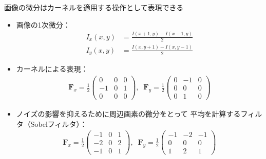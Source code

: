 \documentclass[10pt]{beamer}
\begin{document}
	\begin{frame}{画像の微分はカーネルを適用する操作として表現できる}
	    \begin{itemize}
	        \item 画像の1次微分：
        	    \begin{align*}
        	        I_x(x, y) &= \frac{I(x+1, y)-I(x-1, y)}{2} \\
        	        I_y(x, y) &= \frac{I(x, y+1)-I(x, y-1)}{2} 
        	    \end{align*}
	        \item カーネルによる表現：
        	    \begin{align*}
        	        \bm F_x = \frac{1}{2}
        	        \begin{pmatrix}
        	            0   &0  &0  \\
        	            -1   &0  &1  \\
        	            0   &0  &0  
        	        \end{pmatrix},\;\;
        	        \bm F_y = \frac{1}{2}
        	        \begin{pmatrix}
        	            0   &-1  &0  \\
        	            0   &0  &0  \\
        	            0   &1  &0  
        	        \end{pmatrix}
        	    \end{align*}
            \item ノイズの影響を抑えるために周辺画素の微分をとって
                平均を計算するフィルタ（Sobelフィルタ）：
                \begin{align*}
        	        \bm F_x = \frac{1}{2}
        	        \begin{pmatrix}
        	            -1   &0  &1  \\
        	            -2   &0  &2  \\
        	            -1   &0  &1  
        	        \end{pmatrix},\;\;
        	        \bm F_y = \frac{1}{2}
        	        \begin{pmatrix}
        	            -1   &-2  &-1  \\
        	            0   &0  &0  \\
        	            1   &2  &1  
        	        \end{pmatrix}
        	    \end{align*}
	    \end{itemize}
	\end{frame}
	
\end{document}
